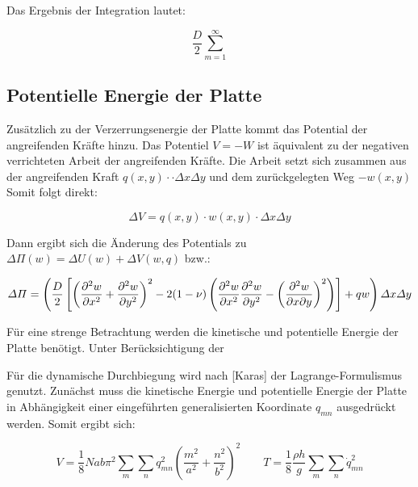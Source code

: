Das Ergebnis der Integration lautet:

\begin{equation}
	\dfrac{D}{2} \sum_{m=1}^{\infty}
\end{equation}

\subsection{Potentielle Energie der Platte}

Zusätzlich zu der Verzerrungsenergie der Platte kommt das Potential der angreifenden Kräfte hinzu.
Das Potentiel $V = -W$ ist äquivalent zu der negativen verrichteten Arbeit der angreifenden Kräfte.
Die Arbeit setzt sich zusammen aus der angreifenden Kraft $q(x,y) \cdot  \cdot \Delta x \Delta y$ und dem zurückgelegten Weg $-w(x,y)$	
Somit folgt direkt:

\begin{equation}
\Delta V = q(x,y) \cdot w(x,y) \cdot \Delta x \Delta y 
\end{equation}

Dann ergibt sich die Änderung des Potentials zu $\Delta \Pi(w) = \Delta U(w) + \Delta V(w,q)$ bzw.:

\begin{equation}
	\Delta \Pi = \left( \dfrac{D}{2}\left[
	\left(
	\dfrac{\partial^2 w}{\partial x^2} + \dfrac{\partial^2 w}{\partial y^2}\right)^2 
	- 2 (1-\nu) \left( \dfrac{\partial^2 w}{\partial x^2} \dfrac{\partial^2 w}{\partial y^2} - \left( \dfrac{\partial^2 w}{\partial x \partial y} \right)^2\right) \right] + q w \right) \Delta x \Delta y \\
\end{equation}



Für eine strenge Betrachtung werden die kinetische und potentielle Energie der Platte benötigt.
Unter Berücksichtigung der

Für die dynamische Durchbiegung wird nach [Karas] der Lagrange-Formulismus genutzt. Zunächst muss die kinetische Energie und potentielle Energie der Platte in Abhängigkeit einer eingeführten generalisierten Koordinate $q_{mn}$ ausgedrückt werden. Somit ergibt sich:

\begin{equation}
V = \dfrac{1}{8}N a b \pi^2 \sum_m \sum_n q_{mn}^2 \left(\frac{m^2}{a^2} + \frac{n^2}{b^2} \right)^2 \qquad T = \dfrac{1}{8 }\dfrac{\rho h}{g }\sum_m \sum_n \dot{q}_{mn}^2
\end{equation}


